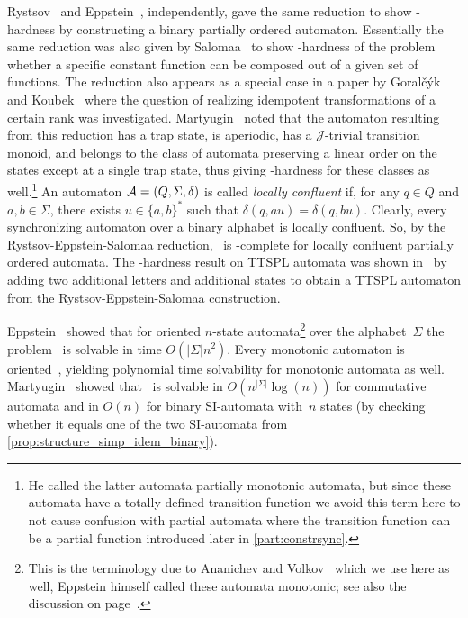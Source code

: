 Rystsov~\cite{Rys80} and Eppstein~\cite{Eppstein90}, independently,
gave the same reduction to show \NP-hardness by constructing
a binary partially ordered automaton.
Essentially the same reduction was also given by Salomaa~\cite{DBLP:journals/tcs/Salomaa03}
to show \NP-hardness of the problem whether a specific constant function can be composed out of a given
set of functions.
The reduction also appears as a special case in a paper 
by Goral\v{c}\'yk and Koubek~\cite{GorKou95} where 
the question of realizing idempotent transformations
of a certain rank was investigated.
Martyugin~\cite[Prop.~4.2]{Mar2009b} noted that the
automaton resulting from this reduction has a trap state,
is aperiodic, has a $\mathcal J$-trivial transition monoid,
and belongs to the class of automata preserving a linear order on the states
except at a single trap state, thus giving \NP-hardness for these classes as well.\footnote{He called the latter automata partially monotonic automata, but since these automata
	have a totally defined transition function
	we avoid this term here
	to not cause confusion with partial automata where the transition function
	can be a partial function introduced later in \cref{part:constrsync}.}
An automaton $\mathcal A = (Q, \Sigma, \delta)$ is called \emph{locally confluent}
if, for any $q \in Q$ and $a,b \in \Sigma$,
there exists $u \in \{a,b\}^*$ such that $\delta(q, au) = \delta(q, bu)$.
Clearly, every synchronizing automaton
over a binary alphabet is locally confluent.
So, by the Rystsov-Eppstein-Salomaa reduction,
\DFASWS\ is \NP-complete for locally confluent partially ordered automata.
The \NP-hardness result
on TTSPL automata
was shown in~\cite{DBLP:journals/ita/BruchertseiferF21}
by adding two additional letters and additional states to obtain a TTSPL automaton
from the Rystsov-Eppstein-Salomaa construction.

Eppstein~\cite{Eppstein90} showed that for oriented $n$-state automata\footnote{This is the terminology due to Ananichev and 
	Volkov~\cite{DBLP:journals/tcs/AnanichevV04} which we use here as well, Eppstein himself called these automata monotonic; see 
	also the discussion on page~\pageref{discussion:monotonic}.}  
over the alphabet~$\Sigma$ the problem \DFASWS\ is solvable
in time $O(|\Sigma| n^2 )$. Every monotonic automaton is oriented~\cite{DBLP:journals/tcs/AnanichevV04},
yielding polynomial time solvability for monotonic automata as well.
Martyugin~\cite{Mar2009b} showed that \DFASWS\ is solvable in $O(n^{|\Sigma|} \log(n))$
for commutative automata and in $O(n)$ for binary SI-automata with~$n$ states (by checking
whether it equals one of the two SI-automata from \cref{prop:structure_simp_idem_binary}).

